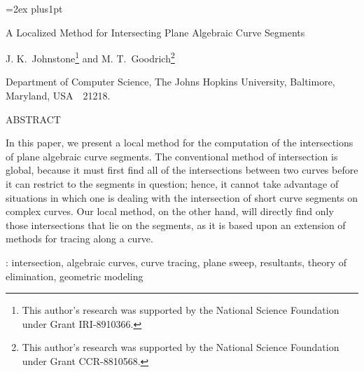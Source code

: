 
\SingleSpace
\setlength{\oddsidemargin}{-.2in}
\setlength{\evensidemargin}{0pt}
\setlength{\headsep}{0pt}
\setlength{\topmargin}{-.5in}
\setlength{\textheight}{10.2in}
\setlength{\textwidth}{7in}
\pagestyle{empty}
\parskip=2ex plus1pt		%
\parindent=0pt			%
% 

\noindent A Localized Method for Intersecting Plane Algebraic Curve Segments

\hspace{4ex}

\noindent J. K.\ Johnstone\footnote{This author's research was supported 
	by the National Science Foundation under Grant IRI-8910366.} 
and M. T.\ Goodrich\footnote{This 
	author's research was supported by
	the National Science Foundation under Grant CCR-8810568.}

\noindent Department of Computer Science, The Johns Hopkins University, Baltimore,
	Maryland, USA\ \  21218.

\vspace{20ex}

\noindent ABSTRACT

\vspace{3ex}
\noindent In this paper, we present a local method for the 
computation of the intersections of plane algebraic curve segments.
The conventional method of intersection is global, because it must first find all 
of the intersections between two curves before it can restrict to the segments in question;
hence, it cannot take advantage of situations in which one is dealing with the intersection of
short curve segments on complex curves.
Our local method, on the other hand, will directly find only those intersections that lie 
on the segments, as it is based upon an extension of methods for tracing along a curve.

\vspace{3ex}
: intersection, algebraic curves, curve tracing, plane sweep, 
resultants, theory of elimination, geometric modeling

